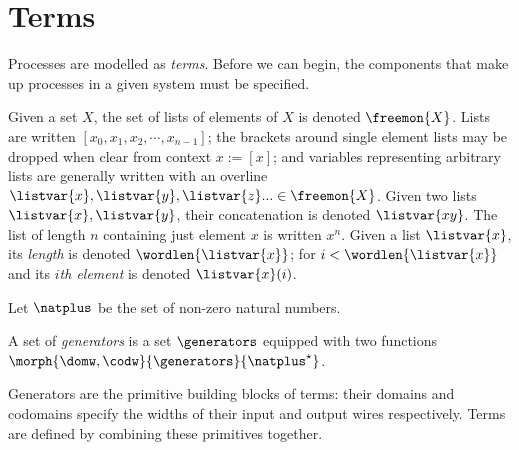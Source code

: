 \section{Terms}

Processes are modelled as \emph{terms}.
Before we can begin, the components that make up processes in a given system
must be specified.

\begin{notation}[Lists]
    Given a set \(X\), the set of lists of elements of \(X\) is denoted
    \(\freemon{X}\).
    Lists are written \([x_0, x_1, x_2, \cdots, x_{n-1}]\); the brackets around
    single element lists may be dropped when clear from context \(x := [x]\);
    and variables representing arbitrary lists are generally written with an
    overline \(
        \listvar{x}, \listvar{y}, \listvar{z}... \in \freemon{X}
    \).
    Given two lists \(\listvar{x}, \listvar{y}\), their concatenation is
    denoted \(\listvar{xy}\).
    The list of length \(n\) containing just element \(x\) is written \(x^n\).
    Given a list \(\listvar{x}\), its \emph{length} is denoted
    \(\wordlen{\listvar{x}}\); for \(i < \wordlen{\listvar{x}}\) and its
    \(i\)\emph{th element} is denoted \(\listvar{x}(i)\).
\end{notation}

\begin{notation}
    Let \(\natplus\) be the set of non-zero natural numbers.
\end{notation}

\begin{definition}[Generators]
    A set of \emph{generators} is a set \(\generators\) equipped with two
    functions \(\morph{\domw,\codw}{\generators}{\natplus^\star}\).
\end{definition}

Generators are the primitive building blocks of terms: their domains and
codomains specify the widths of their input and output wires respectively.
Terms are defined by combining these primitives together.

